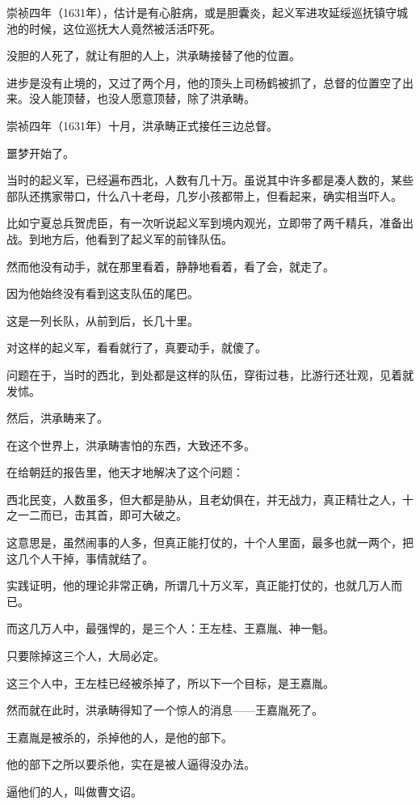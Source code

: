 \begin{multicols}{\theparacolNo}
崇祯四年（1631年），估计是有心脏病，或是胆囊炎，起义军进攻延绥巡抚镇守城池的时候，这位巡抚大人竟然被活活吓死。

没胆的人死了，就让有胆的人上，洪承畴接替了他的位置。

进步是没有止境的，又过了两个月，他的顶头上司杨鹤被抓了，总督的位置空了出来。没人能顶替，也没人愿意顶替，除了洪承畴。

崇祯四年（1631年）十月，洪承畴正式接任三边总督。

噩梦开始了。

当时的起义军，已经遍布西北，人数有几十万。虽说其中许多都是凑人数的，某些部队还携家带口，什么八十老母，几岁小孩都带上，但看起来，确实相当吓人。

比如宁夏总兵贺虎臣，有一次听说起义军到境内观光，立即带了两千精兵，准备出战。到地方后，他看到了起义军的前锋队伍。

然而他没有动手，就在那里看着，静静地看着，看了会，就走了。

因为他始终没有看到这支队伍的尾巴。

这是一列长队，从前到后，长几十里。

对这样的起义军，看看就行了，真要动手，就傻了。

问题在于，当时的西北，到处都是这样的队伍，穿街过巷，比游行还壮观，见着就发怵。

然后，洪承畴来了。

在这个世界上，洪承畴害怕的东西，大致还不多。

在给朝廷的报告里，他天才地解决了这个问题：

西北民变，人数虽多，但大都是胁从，且老幼俱在，并无战力，真正精壮之人，十之一二而已，击其首，即可大破之。

这意思是，虽然闹事的人多，但真正能打仗的，十个人里面，最多也就一两个，把这几个人干掉，事情就结了。

实践证明，他的理论非常正确，所谓几十万义军，真正能打仗的，也就几万人而已。

而这几万人中，最强悍的，是三个人：王左桂、王嘉胤、神一魁。

只要除掉这三个人，大局必定。

这三个人中，王左桂已经被杀掉了，所以下一个目标，是王嘉胤。

然而就在此时，洪承畴得知了一个惊人的消息——王嘉胤死了。

王嘉胤是被杀的，杀掉他的人，是他的部下。

他的部下之所以要杀他，实在是被人逼得没办法。

逼他们的人，叫做曹文诏。
\ifnum{}
	\end{multicols}
\fi
\newpage
